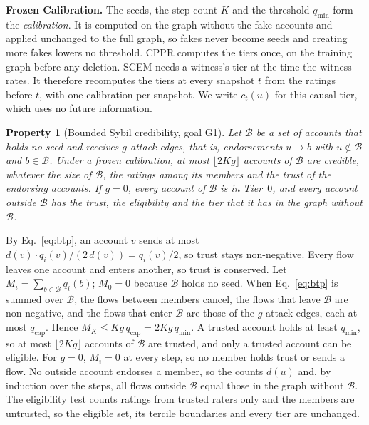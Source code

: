 \documentclass[lettersize,journal]{IEEEtran}
\newtheorem{property}{Property}
\begin{document}
\smallskip\noindent\textbf{Frozen Calibration.}
The seeds, the step count $K$ and the threshold $q_{\min}$ form the \emph{calibration}.
It is computed on the graph without the fake accounts and applied unchanged to the full graph, so fakes never become seeds and creating more fakes lowers no threshold.
CPPR computes the tiers once, on the training graph before any deletion.
SCEM needs a witness's tier at the time the witness rates. It therefore recomputes the tiers at every snapshot $t$ from the ratings before $t$, with one calibration per snapshot. We write $c_t(u)$ for this causal tier, which uses no future information.

\begin{property}[Bounded Sybil credibility, goal G1]
\label{prop:btp}
Let $\mathcal{B}$ be a set of accounts that holds no seed and receives $g$ attack edges, that is, endorsements $u \to b$ with $u \notin \mathcal{B}$ and $b \in \mathcal{B}$.
Under a frozen calibration, at most $\lfloor 2Kg \rfloor$ accounts of $\mathcal{B}$ are credible, whatever the size of $\mathcal{B}$, the ratings among its members and the trust of the endorsing accounts.
If $g = 0$, every account of $\mathcal{B}$ is in Tier~$0$, and every account outside $\mathcal{B}$ has the trust, the eligibility and the tier that it has in the graph without $\mathcal{B}$.
\end{property}
\begin{IEEEproof}
By Eq.~\eqref{eq:btp}, an account $v$ sends at most $d(v) \cdot q_i(v)/(2\,d(v)) = q_i(v)/2$, so trust stays non-negative. Every flow leaves one account and enters another, so trust is conserved.
Let $M_i = \sum_{b \in \mathcal{B}} q_i(b)$; $M_0 = 0$ because $\mathcal{B}$ holds no seed.
When Eq.~\eqref{eq:btp} is summed over $\mathcal{B}$, the flows between members cancel, the flows that leave $\mathcal{B}$ are non-negative, and the flows that enter $\mathcal{B}$ are those of the $g$ attack edges, each at most $q_{\mathrm{cap}}$.
Hence $M_K \le K g\, q_{\mathrm{cap}} = 2Kg\, q_{\min}$.
A trusted account holds at least $q_{\min}$, so at most $\lfloor 2Kg \rfloor$ accounts of $\mathcal{B}$ are trusted, and only a trusted account can be eligible.
For $g = 0$, $M_i = 0$ at every step, so no member holds trust or sends a flow.
No outside account endorses a member, so the counts $d(u)$ and, by induction over the steps, all flows outside $\mathcal{B}$ equal those in the graph without $\mathcal{B}$.
The eligibility test counts ratings from trusted raters only and the members are untrusted, so the eligible set, its tercile boundaries and every tier are unchanged.
\end{IEEEproof}
\end{document}
